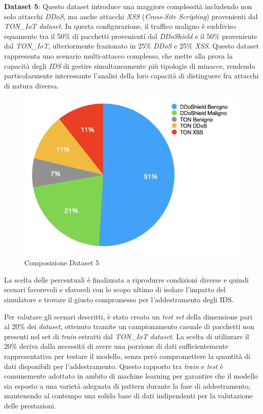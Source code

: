 \textbf{Dataset 5}: Questo dataset introduce una maggiore complessità includendo non solo attacchi \textit{DDoS}, ma anche attacchi \textit{XSS} (\textit{Cross-Site Scripting}) provenienti dal \textit{TON\_IoT dataset}. In questa configurazione, il traffico maligno è suddiviso equamente tra il 50\% di pacchetti provenienti dal \textit{DDoShield} e il 50\% proveniente dal \textit{TON\_IoT}, ulteriormente frazionato in 25\% \textit{DDoS} e 25\% \textit{XSS}. Questo dataset rappresenta uno scenario multi-attacco complesso, che mette alla prova la capacità degli \textit{IDS} di gestire simultaneamente più tipologie di minacce, rendendo particolarmente interessante l'analisi della loro capacità di distinguere fra attacchi di natura diversa.

\begin{figure}[htbp]
\centering
\includegraphics[scale= 0.8]{UNINA_MSc_Thesis_Project/img/chapterRisulati/composizione_DATASET_5.png}
  \caption{Composizione Dataset 5}
\end{figure}

La scelta delle percentuali è finalizzata a riprodurre condizioni diverse e quindi scenari favorevoli e sfavoreli con lo scopo ultimo di isolare l'impatto del simulatore e trovare il giusto compromesso per l'addestramento degli IDS.

Per valutare gli scenari descritti, è stato creato un \textit{test set} della dimensione pari al 20\% dei \textit{dataset}, ottenuto tramite un campionamento casuale di pacchetti non presenti nel set di \textit{train} estratti dal \textit{TON\_IoT dataset}. La scelta di utilizzare il 20\% deriva dalla necessità di avere una porzione di dati sufficientemente rappresentativa per testare il modello, senza però compromettere la quantità di dati disponibili per l'addestramento. Questo rapporto tra \textit{train} e \textit{test} è comunemente adottato in ambito di machine learning per garantire che il modello sia esposto a una varietà adeguata di pattern durante la fase di addestramento, mantenendo al contempo una solida base di dati indipendenti per la valutazione delle prestazioni.

